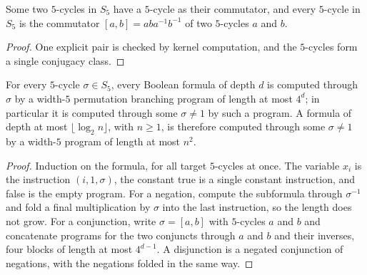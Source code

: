 \begin{lemma}
  \label{lem:circuits-five-cycles}
  \leanok
  Some two $5$-cycles in $S_5$ have a $5$-cycle as their commutator, and
  every $5$-cycle in $S_5$ is the commutator $[a, b] = a b a^{-1} b^{-1}$ of
  two $5$-cycles $a$ and $b$.
\end{lemma}
\begin{proof}
  \leanok
  One explicit pair is checked by kernel computation, and the $5$-cycles form
  a single conjugacy class.
\end{proof}

\begin{theorem}
  \label{thm:circuits-barrington-finite}
  \leanok
  For every $5$-cycle $\sigma \in S_5$, every Boolean formula of depth $d$ is
  computed through $\sigma$ by a width-$5$ permutation branching program of
  length at most $4^d$; in particular it is computed through some
  $\sigma \neq 1$ by such a program. A formula of depth at most
  $\lfloor \log_2 n \rfloor$, with $n \ge 1$, is therefore computed through
  some $\sigma \neq 1$ by a width-$5$ program of length at most $n^2$.
\end{theorem}
\begin{proof}
  \leanok
  Induction on the formula, for all target $5$-cycles at once. The variable
  $x_i$ is the instruction $(i, 1, \sigma)$, the constant true is a single
  constant instruction, and false is the empty program. For a negation,
  compute the subformula through $\sigma^{-1}$ and fold a final
  multiplication by $\sigma$ into the last instruction, so the length does not
  grow. For a conjunction, write $\sigma = [a, b]$ with $5$-cycles $a$ and
  $b$ and concatenate programs for the two conjuncts through $a$ and $b$ and
  their inverses, four blocks of length at most $4^{d-1}$. A disjunction is a
  negated conjunction of negations, with the negations folded in the same
  way.
\end{proof}

